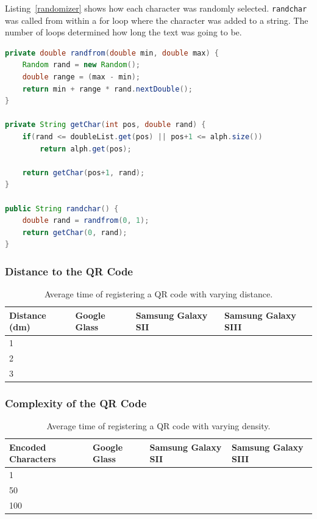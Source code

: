 Listing~\ref{randomizer} shows how each character was randomly selected. \texttt{randchar} was called from within a for loop where the character was added to a string. The number of loops determined how long the text was going to be. 

\begin{lstlisting}[language=Java, caption={The randomizer class}, label=randomizer]
private double randfrom(double min, double max) {
	Random rand = new Random();
	double range = (max - min);
	return min + range * rand.nextDouble();
}

private String getChar(int pos, double rand) {
	if(rand <= doubleList.get(pos) || pos+1 <= alph.size())
		return alph.get(pos);
		
	return getChar(pos+1, rand);
}

public String randchar() {
	double rand = randfrom(0, 1);
	return getChar(0, rand);
}
\end{lstlisting}

\subsubsection{Distance to the QR Code}

	\begin{table}[ht!]
    		\caption{Average time of registering a QR code with varying distance.} \label{tab:distanceAverage}
		\centering \begin{tabularx}{\textwidth}{l|X|X|X} \hline
		\textbf{Distance (dm)} & \textbf{Google Glass} & \textbf{Samsung Galaxy SII} & \textbf{Samsung Galaxy SIII} \\ \hline \hline
       
		1	&	&	&	\\ \hline
		2	&	&	&	\\ \hline
		3	&	&	&	\\ \hline
		
		\end{tabularx}
	\end{table}

\subsubsection{Complexity of the QR Code}

	\begin{table}[H]%
    		\caption{Average time of registering a QR code with varying density.} \label{tab:complexityAverage}
		\centering \begin{tabularx}{\textwidth}{l|X|X|X} \hline
		\textbf{Encoded Characters} & \textbf{Google Glass} & \textbf{Samsung Galaxy SII} & \textbf{Samsung Galaxy SIII} \\ \hline \hline
       
		1	&	&	&	\\ \hline
		50	&	&	&	\\ \hline
		100	&	&	&	\\ \hline
		
		\end{tabularx}
	\end{table}

